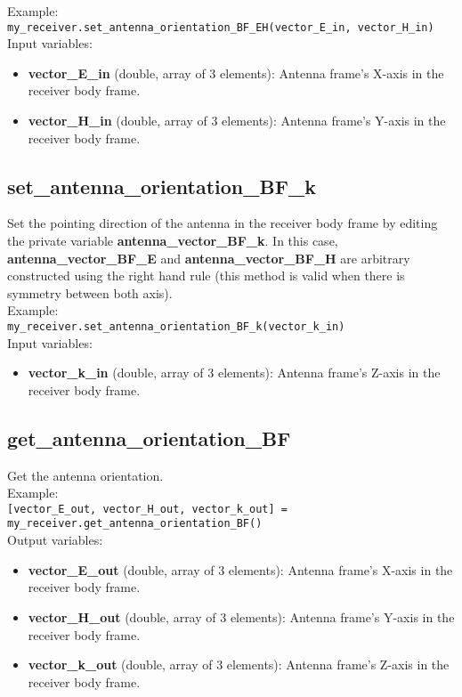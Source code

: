 Example:\\

\texttt{my\_receiver.set\_antenna\_orientation\_BF\_EH(vector\_E\_in, vector\_H\_in)}\\

Input variables:
\begin{itemize}
\item {\bf vector\_E\_in} (double, array of 3 elements): Antenna frame's X-axis in the receiver body frame.
\item {\bf vector\_H\_in} (double, array of 3 elements): Antenna frame's Y-axis in the receiver body frame.
\end{itemize}


\subsection{set\_antenna\_orientation\_BF\_k}

Set the pointing direction of the antenna in the receiver body frame by editing the private variable {\bf antenna\_vector\_BF\_k}. In this case, {\bf antenna\_vector\_BF\_E} and {\bf antenna\_vector\_BF\_H} are arbitrary constructed using the right hand rule (this method is valid when there is symmetry between both axis).\\

Example:\\

\texttt{my\_receiver.set\_antenna\_orientation\_BF\_k(vector\_k\_in)}\\

Input variables:
\begin{itemize}
\item {\bf vector\_k\_in} (double, array of 3 elements): Antenna frame's Z-axis in the receiver body frame.
\end{itemize}


\subsection{get\_antenna\_orientation\_BF}

Get the antenna orientation.\\

Example:\\

\texttt{[vector\_E\_out, vector\_H\_out, vector\_k\_out] = my\_receiver.get\_antenna\_orientation\_BF()}\\

Output variables:
\begin{itemize}
\item {\bf vector\_E\_out} (double, array of 3 elements): Antenna frame's X-axis in the receiver body frame.
\item {\bf vector\_H\_out} (double, array of 3 elements): Antenna frame's Y-axis in the receiver body frame.
\item {\bf vector\_k\_out} (double, array of 3 elements): Antenna frame's Z-axis in the receiver body frame.
\end{itemize}


